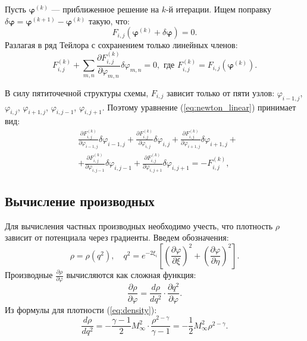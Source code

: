 \documentclass[a4paper,12pt]{article}
\begin{document}
	Пусть $\boldsymbol{\varphi}^{(k)}$ — приближенное решение на $k$-й итерации. Ищем поправку $\delta \boldsymbol{\varphi} = \boldsymbol{\varphi}^{(k+1)} - \boldsymbol{\varphi}^{(k)}$ такую, что:
	\[
	F_{i,j}(\boldsymbol{\varphi}^{(k)} + \delta \boldsymbol{\varphi}) = 0.
	\]
	Разлагая в ряд Тейлора с сохранением только линейных членов:
	\[
	F_{i,j}^{(k)} + \sum_{m,n} \frac{\partial F_{i,j}^{(k)}}{\partial \varphi_{m,n}} \delta \varphi_{m,n} = 0, \text{ где } F_{i,j}^{(k)} = F_{i,j}(\boldsymbol{\varphi}^{(k)}).
	\label{eq:newton_linear}
	\]

	
	В силу пятиточечной структуры схемы, $F_{i,j}$ зависит только от пяти узлов: $\varphi_{i-1,j}$, $\varphi_{i,j}$, $\varphi_{i+1,j}$, $\varphi_{i,j-1}$, $\varphi_{i,j+1}$. Поэтому уравнение (\ref{eq:newton_linear}) принимает вид:
	\begin{equation}
		\begin{aligned}
			& \frac{\partial F_{i,j}^{(k)}}{\partial \varphi_{i-1,j}} \delta \varphi_{i-1,j} + \frac{\partial F_{i,j}^{(k)}}{\partial \varphi_{i,j}} \delta \varphi_{i,j} + \frac{\partial F_{i,j}^{(k)}}{\partial \varphi_{i+1,j}} \delta \varphi_{i+1,j} +\\
			&+ \frac{\partial F_{i,j}^{(k)}}{\partial \varphi_{i,j-1}} \delta \varphi_{i,j-1} + \frac{\partial F_{i,j}^{(k)}}{\partial \varphi_{i,j+1}} \delta \varphi_{i,j+1} = - F_{i,j}^{(k)},
		\end{aligned}
		\label{eq:newton_system}
	\end{equation}
	
	\subsection{Вычисление производных}
	Для вычисления частных производных необходимо учесть, что плотность $\rho$ зависит от потенциала через градиенты. Введем обозначения:
	\[
	\rho = \rho(q^2), \quad q^2 = e^{-2\xi_i} \left[ \left( \frac{\partial \varphi}{\partial \xi} \right) ^2 + \left( \frac{\partial \varphi}{\partial \eta} \right) ^2 \right].
	\]
	Производные $\frac{\partial \rho}{\partial \varphi}$ вычисляются как сложная функция:
	\[
	\frac{\partial \rho}{\partial \varphi} = \frac{d\rho}{dq^2} \cdot \frac{\partial q^2}{\partial \varphi}.
	\]
	Из формулы для плотности (\ref{eq:density}):
	\[
	\frac{d\rho}{dq^2} = -\frac{\gamma-1}{2} M_\infty^2 \cdot \frac{\rho^{2-\gamma}}{\gamma-1} = -\frac{1}{2} M_\infty^2 \rho^{2-\gamma}.
	\]
	
\end{document}

